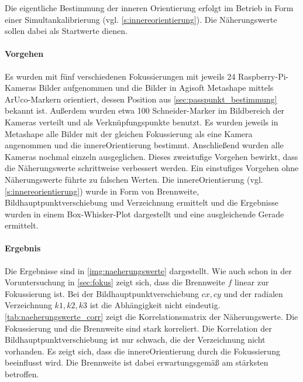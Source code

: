 \documentclass[./00PhotoBox.tex]{subfiles}
\begin{document}
Die eigentliche Bestimmung der inneren Orientierung erfolgt im Betrieb in Form einer Simultankalibrierung (vgl. \autoref{s:innereorientierung}). Die Näherungswerte sollen dabei als Startwerte dienen.

\paragraph{Vorgehen}

Es wurden mit fünf verschiedenen Fokussierungen mit jeweils 24 Rasp\-berry-Pi-Kameras Bilder aufgenommen und die Bilder in Agisoft Metashape mittels ArUco-Markern orientiert, dessen Position aus \autoref{sec:passpunkt_bestimmung} bekannt ist. Außerdem wurden etwa 100 Schneider-Marker im Bildbereich der Kameras verteilt und als Verknüpfungspunkte benutzt. Es wurden jeweils in Metashape alle Bilder mit der gleichen Fokussierung als eine Kamera angenommen und die \gls{innereOrientierung} bestimmt. Anschließend wurden alle Kameras nochmal einzeln ausgeglichen. Dieses zweistufige Vorgehen bewirkt, dass die Näherungswerte schrittweise verbessert werden. Ein einstufiges Vorgehen ohne Näherungswerte führte zu falschen Werten. Die \gls{innereOrientierung} (vgl. \autoref{s:innereorientierung}) wurde in Form von Brennweite, \Gls{Bildhauptpunkt}verschiebung und \Gls{Verzeichnung} ermittelt und die Ergebnisse wurden in einem Box-Whisker-Plot dargestellt und eine ausgleichende Gerade ermittelt.

\paragraph{Ergebnis}

Die Ergebnisse sind in \autoref{img:naeherungswerte} dargestellt. Wie auch schon in der Voruntersuchung in \autoref{sec:fokus} zeigt sich, dass die \Gls{Brennweite} $f$ linear zur Fokussierung ist. Bei der \Gls{Bildhauptpunkt}verschiebung $cx,cy$ und der radialen \Gls{Verzeichnung} $k1,k2,k3$ ist die Abhängigkeit nicht eindeutig. \autoref{tab:naeherungswerte_corr} zeigt die Korrelationsmatrix der Näherungswerte. Die Fokussierung und die \Gls{Brennweite} sind stark korreliert. Die Korrelation der \Gls{Bildhauptpunkt}verschiebung ist nur schwach, die der \Gls{Verzeichnung} nicht vorhanden. Es zeigt sich, dass die \gls{innereOrientierung} durch die Fokussierung beeinflusst wird. Die \Gls{Brennweite} ist dabei erwartungsgemäß am stärksten betroffen.
\end{document}
